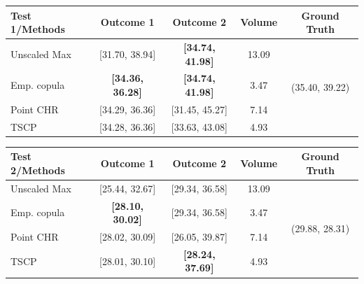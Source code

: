 \centering
\captionsetup[subtable]{justification=centering}
\small
\begin{subtable}{\linewidth}
\centering
\begin{tabular}[t]{l c c c c}
\toprule
\textbf{Test 1/Methods} 
& Outcome 1 & Outcome 2 & Volume & Ground Truth \\
\midrule
Unscaled Max & [31.70, 38.94] & \textbf{[34.74, 41.98]} & 13.09 & \multirow{4}{*}{(35.40, 39.22)} \\
Emp. copula & \textbf{[34.36, 36.28]} & \textbf{[34.74, 41.98]} & {3.47} &\\
Point CHR & [34.29, 36.36] & [31.45, 45.27] & 7.14 &\\
TSCP & [34.28, 36.36] & [33.63, 43.08] & 4.93 &\\
\midrule
\end{tabular}
\end{subtable}

\small
\begin{subtable}{\linewidth}
\centering
\begin{tabular}[t]{l c c c c}
\midrule
\textbf{Test 2/Methods} 
& Outcome 1 & Outcome 2 & Volume & Ground Truth \\
\midrule
Unscaled Max & [25.44, 32.67] & \color{red}[29.34, 36.58] & 13.09 & \multirow{4}{*}{(29.88, 28.31)} \\
Emp. copula & \textbf{[28.10, 30.02]} & \color{red}[29.34, 36.58] & 3.47 & \\
Point CHR & [28.02, 30.09] & [26.05, 39.87] & 7.14 & \\
TSCP & [28.01, 30.10] & \textbf{[28.24, 37.69]} & {4.93} & \\
\bottomrule
\end{tabular}
\end{subtable}
